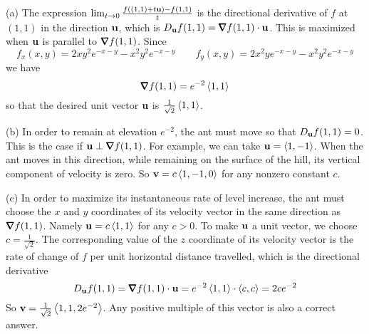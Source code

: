 \begin{solution}
(a) The expression
$
\lim_{t\rightarrow 0}\frac{f((1,1)+t\mathbf{u})-f(1,1)}{t}
$
is the directional derivative of $f$ at $(1,1)$ in the direction $\mathbf{u}$,
which is $D_\vu f(1,1)=\vnabla f(1,1)\cdot\vu$. This is maximized when $\mathbf{u}$ is
parallel to  $\vnabla f(1,1)$. Since
\begin{equation*}
f_x(x,y)=2xy^2e^{-x-y}-x^2y^2e^{-x-y}\qquad
f_y(x,y)=2x^2ye^{-x-y}-x^2y^2e^{-x-y}
\end{equation*}
we have
\begin{equation*}
\vnabla f(1,1)=e^{-2}\llt 1,1\rgt
\end{equation*}
so that the desired unit vector $\mathbf{u}$ is $\frac{1}{\sqrt{2}}\left< 1,1\right>$.

(b) In order to remain at elevation $e^{-2}$, the ant must move so
that $D_{\mathbf{u}} f(1,1)=0$. This is the case if $\vu\perp\vnabla f(1,1)$.
For example, we can take $\mathbf{u}=\left< 1,-1\right>$. When the ant moves 
in this direction, while remaining on the surface of the hill, its 
vertical component of velocity is zero. So $\mathbf{v}=c\left< 1,-1,0\right>$ for any 
nonzero constant $c$.

(c) In order to maximize its instantaneous rate of level increase,
the ant must choose the $x$ and $y$ coordinates of its velocity vector
in the same direction as  $\vnabla f(1,1)$. Namely $\mathbf{u}=c\left< 1,1\right>$ for any
$c>0$. To make $\mathbf{u}$ a unit vector, we choose $c=\frac{1}{\sqrt{2}}$.
The corresponding value of the $z$ coordinate of its velocity vector is
the rate of change of $f$ per unit horizontal distance travelled, which
is the directional derivative 
\begin{equation*}
D_\vu f(1,1)=\vnabla f(1,1)\cdot\vu=e^{-2}\llt 1,1\rgt \cdot\llt c,c\rgt
=2ce^{-2}
\end{equation*}
 So $\mathbf{v}=\frac{1}{\sqrt{2}}\left< 1,1,2e^{-2}\right>$. Any positive multiple
of this vector is also a correct answer.
\end{solution}

